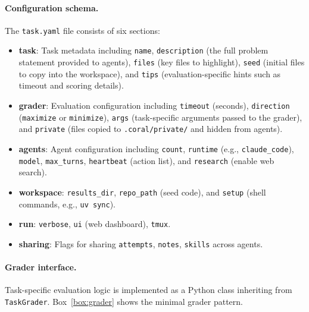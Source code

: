 \paragraph{Configuration schema.} The \texttt{task.yaml} file consists of six sections:
\begin{itemize}[nosep,leftmargin=*]
    \item \textbf{task}: Task metadata including \texttt{name}, \texttt{description} (the full problem statement provided to agents), \texttt{files} (key files to highlight), \texttt{seed} (initial files to copy into the workspace), and \texttt{tips} (evaluation-specific hints such as timeout and scoring details).
    \item \textbf{grader}: Evaluation configuration including \texttt{timeout} (seconds), \texttt{direction} (\texttt{maximize} or \texttt{minimize}), \texttt{args} (task-specific arguments passed to the grader), and \texttt{private} (files copied to \texttt{.coral/private/} and hidden from agents).
    \item \textbf{agents}: Agent configuration including \texttt{count}, \texttt{runtime} (e.g., \texttt{claude\_code}), \texttt{model}, \texttt{max\_turns}, \texttt{heartbeat} (action list), and \texttt{research} (enable web search).
    \item \textbf{workspace}: \texttt{results\_dir}, \texttt{repo\_path} (seed code), and \texttt{setup} (shell commands, e.g., \texttt{uv sync}).
    \item \textbf{run}: \texttt{verbose}, \texttt{ui} (web dashboard), \texttt{tmux}.
    \item \textbf{sharing}: Flags for sharing \texttt{attempts}, \texttt{notes}, \texttt{skills} across agents.
\end{itemize}

\paragraph{Grader interface.} Task-specific evaluation logic is implemented as a Python class inheriting from \texttt{TaskGrader}. Box~\ref{box:grader} shows the minimal grader pattern.

